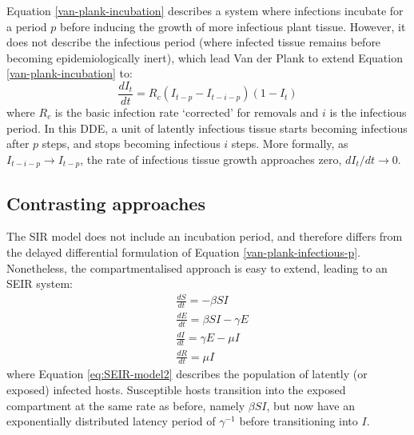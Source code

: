 Equation \ref{van-plank-incubation} describes a system where
infections incubate for a period $p$ before inducing the growth of more infectious plant tissue.
However, it does not describe the infectious period (where infected tissue remains before becoming epidemiologically inert),
which lead Van der Plank to extend Equation \ref{van-plank-incubation} to:
\begin{equation}
\label{van-plank-infectious-p}
    \frac{dI_t}{dt} = R_c(I_{t-p} - I_{t-i-p})(1 - I_{t})
\end{equation}
where $R_c$ is the basic infection rate `corrected' for removals and $i$ is the infectious period.
In this DDE, a unit of latently infectious tissue starts becoming infectious after $p$ steps, and stops becoming infectious $i$ steps.
More formally, as $I_{t-i-p} \rightarrow I_{t-p}$, the rate of infectious tissue growth approaches zero, $dI_t/dt \rightarrow 0$.

\subsection{Contrasting approaches}
\label{sec:SIR-vs-plank}

The SIR model does not include an incubation period, and therefore differs from the delayed differential formulation 
of Equation \ref{van-plank-infectious-p}. Nonetheless, the compartmentalised approach is easy to extend, leading to an 
SEIR system:
\begin{align}
\label{eq:SEIR-model1}
    &\frac{dS}{dt} = -\beta SI \\
\label{eq:SEIR-model2}
    &\frac{dE}{dt} = \beta SI - \gamma E\\
    &\frac{dI}{dt} = \gamma E - \mu I \\
    \label{eq:SEIR-model3}
    &\frac{dR}{dt} = \mu I
\end{align}
where Equation \ref{eq:SEIR-model2} describes the population of latently (or exposed) infected hosts.
Susceptible hosts transition into the exposed compartment at the same rate as before, namely $\beta SI$, but now have an
exponentially distributed latency period of $\gamma^{-1}$ before transitioning into $I$.

